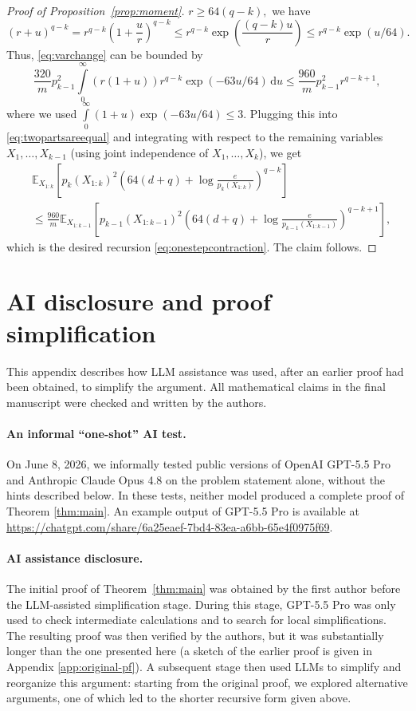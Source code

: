 \documentclass[11pt]{article}
\newcommand{\E}{\mathbb E}
\newcommand{\1}{\mathbf 1}
\theoremstyle{plain}
\theoremstyle{remark}
\begin{document}
\begin{proof}[Proof of Proposition~\ref{prop:moment}]
$
r\ge 64(q-k),
$
we have
\[
(r+u)^{q-k}
=
r^{q-k}\left(1+\frac ur\right)^{q-k}
\le
r^{q-k}
\exp\left(\frac{(q-k)u}{r}\right)
\le
r^{q-k}\exp(u/64).
\]
Thus, \eqref{eq:varchange} can be bounded by 
\[
\frac{320}{m}p_{k-1}^2\int\limits_{0}^\infty\left(r(1 + u)\right)r^{q-k}\exp(-63u/64)\,\mathrm{d} u \le  \frac{960}{m}p_{k-1}^2r^{q - k + 1},
\]
where we used $\int\limits_{0}^\infty(1+u)\exp(-63u/64) \le 3$. Plugging this into \eqref{eq:twopartsareequal} and integrating with respect to the remaining variables $X_1, \ldots, X_{k-1}$ (using joint independence of $X_1, \ldots, X_{k}$), we get
\begin{align*}
&\E_{X_{1:k}}\left[
p_k(X_{1:k})^2
\left(64(d+q)+\log\frac{e}{p_k(X_{1:k})}\right)^{q-k}
\right] 
\\
&\le \frac{960}{m}\E_{X_{1:k-1}}\left[
p_{k-1}(X_{1:k-1})^2
\left(64(d+q)+\log\frac{e}{p_{k-1}(X_{1:k-1})}\right)^{q-k+1}\right],
\end{align*}
which is the desired recursion \eqref{eq:onestepcontraction}. The claim follows. 
\end{proof}

\appendix

{\footnotesize


}

\section{AI disclosure and proof simplification}
\label{app:ai-disclosure}

This appendix describes how LLM assistance was used, after an earlier proof had been obtained, to simplify the argument. All mathematical claims in the final manuscript were checked and written by the authors.

\paragraph{An informal ``one-shot'' AI test.}
 On June 8, 2026, we informally tested public versions of OpenAI GPT-5.5 Pro and Anthropic Claude Opus 4.8 on the problem statement alone, without the hints described below. In these tests, neither model produced a complete proof of Theorem \ref{thm:main}. An example output of GPT-5.5 Pro is available at \url{https://chatgpt.com/share/6a25eaef-7bd4-83ea-a6bb-65e4f0975f69}.


\paragraph{AI assistance disclosure.}
The initial proof of Theorem~\ref{thm:main} was obtained by the first author before the LLM-assisted simplification stage. During this stage, GPT-5.5 Pro was only used to check intermediate calculations and to search for local simplifications. The resulting proof was then verified by the authors, but it was substantially longer than
the one presented here (a sketch of the earlier proof is given in Appendix \ref{app:original-pf}). A subsequent stage then used LLMs to simplify and reorganize this argument: starting from the original proof,
we explored alternative arguments, one of which led to the shorter recursive form given above. 
\end{document}
